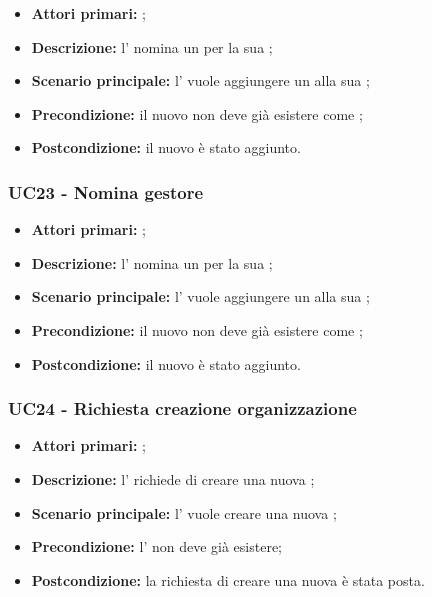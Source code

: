 \documentclass[casi-duso]{subfiles}
\begin{document}
\begin{itemize}
  \item \textbf{Attori primari:} ;
  \item \textbf{Descrizione:} l'  nomina un  per la sua ;
  \item \textbf{Scenario principale:} l'  vuole aggiungere un  alla sua ;
  \item \textbf{Precondizione:} il nuovo  non deve già esistere come ;
  \item \textbf{Postcondizione:} il nuovo  è stato aggiunto.

\end{itemize}


\subsubsection{UC23 - Nomina gestore}
\label{subsub:UC23}

\begin{itemize}
  \item \textbf{Attori primari:} ;
  \item \textbf{Descrizione:} l'  nomina un  per la sua ;
  \item \textbf{Scenario principale:} l'  vuole aggiungere un  alla sua ;
  \item \textbf{Precondizione:} il nuovo  non deve già esistere come ;
  \item \textbf{Postcondizione:} il nuovo  è stato aggiunto.

\end{itemize}


\subsubsection{UC24 - Richiesta creazione organizzazione}
\label{subsub:UC24}

\begin{itemize}
  \item \textbf{Attori primari:} ;
  \item \textbf{Descrizione:} l'  richiede di creare una nuova ;
  \item \textbf{Scenario principale:} l'  vuole creare una nuova ;
  \item \textbf{Precondizione:} l'  non deve già esistere;
  \item \textbf{Postcondizione:} la richiesta di creare una nuova  è stata posta.

\end{itemize}
\end{document}
